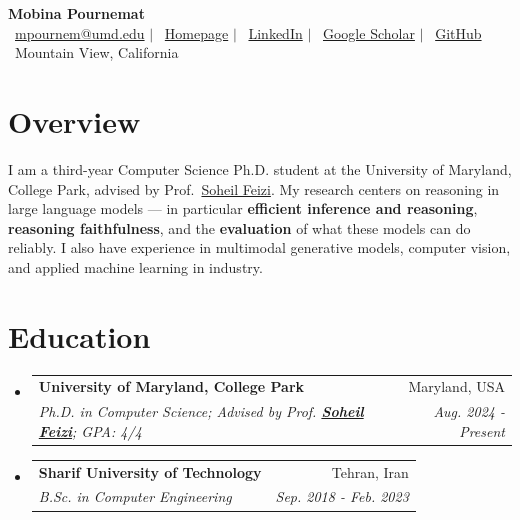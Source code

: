 \documentclass[letterpaper,10pt]{article}
\makeatletter
\newcommand{\cvHeading}[4]{%
  \item
  \begin{tabular*}{\linewidth}{@{}l@{\extracolsep{\fill}}r@{}}
    \textbf{#1} & #2 \\[1pt]
    \textit{\small #3} & \textit{\small #4}
  \end{tabular*}%
}
\newcommand{\feizi}{\href{https://scholar.google.com/citations?user=lptAmrMAAAAJ\&hl=en}{Soheil Feizi}}
\newenvironment{cvlist}
  {\begin{itemize}[leftmargin=0.16in,label=\textbullet,itemsep=5pt,parsep=0pt,topsep=4pt,partopsep=0pt]}
  {\end{itemize}}
\makeatother
\begin{document}
{\LARGE\textbf{Mobina Pournemat}}\\[3pt]
{\small
\faEnvelope\ \href{mailto:mpournem@umd.edu}{mpournem@umd.edu} $|$
\faGlobe\ \href{https://mobinapournemat.github.io/}{Homepage} $|$
\faLinkedin\ \href{https://www.linkedin.com/in/mobina-pournemat-3a38b0211}{LinkedIn} $|$
\faGraduationCap\ \href{https://scholar.google.com/citations?user=x3SgPd8AAAAJ&hl=en}{Google Scholar} $|$
\faGithub\ \href{https://github.com/Mobinapournemat}{GitHub}\\[1pt]
\faMapMarker*\ Mountain View, California
}

\section{Overview}
\small I am a third-year Computer Science Ph.D. student at the University of Maryland, College Park,
advised by Prof.~\feizi. My research centers on reasoning in large language models --- in particular
\textbf{efficient inference and reasoning}, \textbf{reasoning faithfulness}, and the
\textbf{evaluation} of what these models can do reliably. I also have experience in multimodal
generative models, computer vision, and applied machine learning in industry.

\section{Education}
\begin{cvlist}
  \cvHeading
    {University of Maryland, College Park}{Maryland, USA}
    {Ph.D. in Computer Science; Advised by Prof. \textbf{\feizi}; GPA: 4/4}{Aug. 2024 - Present}
  \cvHeading
    {Sharif University of Technology}{Tehran, Iran}
    {B.Sc. in Computer Engineering}{Sep. 2018 - Feb. 2023}
\end{cvlist}

\end{document}
